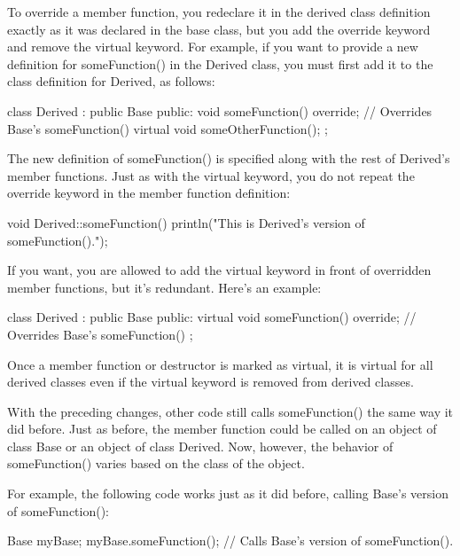 
To override a member function, you redeclare it in the derived class definition exactly as it was declared in the base class, but you add the override keyword and remove the virtual keyword. For example, if you want to provide a new definition for someFunction() in the Derived class, you must first add it to the class definition for Derived, as follows:

\begin{cpp}
class Derived : public Base
{
    public:
        void someFunction() override; // Overrides Base's someFunction()
        virtual void someOtherFunction();
};
\end{cpp}

The new definition of someFunction() is specified along with the rest of Derived’s member functions. Just as with the virtual keyword, you do not repeat the override keyword in the member function definition:

\begin{cpp}
void Derived::someFunction()
{
    println("This is Derived's version of someFunction().");
}
\end{cpp}

If you want, you are allowed to add the virtual keyword in front of overridden member functions, but it’s redundant. Here’s an example:

\begin{cpp}
class Derived : public Base
{
    public:
        virtual void someFunction() override; // Overrides Base's someFunction()
};
\end{cpp}

Once a member function or destructor is marked as virtual, it is virtual for all derived classes even if the virtual keyword is removed from derived classes.


With the preceding changes, other code still calls someFunction() the same way it did before. Just as before, the member function could be called on an object of class Base or an object of class Derived. Now, however, the behavior of someFunction() varies based on the class of the object.

For example, the following code works just as it did before, calling Base’s version of someFunction():

\begin{cpp}
Base myBase;
myBase.someFunction(); // Calls Base's version of someFunction().
\end{cpp}

